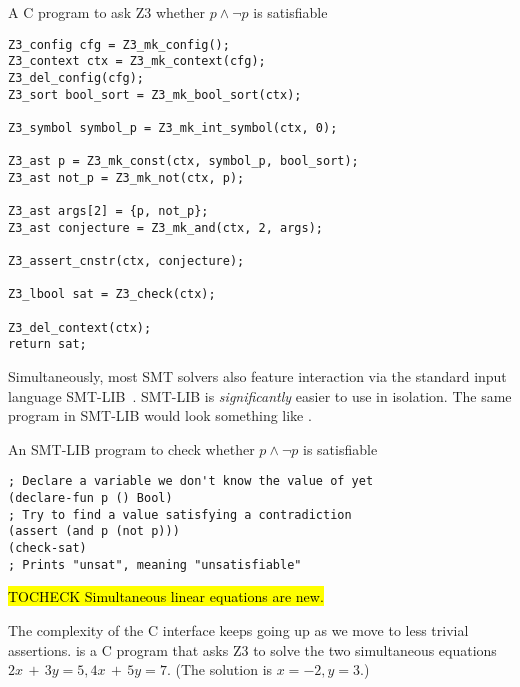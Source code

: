 \begin{program}
\caption{A C program to ask Z3 whether $p \wedge \neg p$ is satisfiable}
\label{fig:c-prop}
\begin{verbatim}
Z3_config cfg = Z3_mk_config();
Z3_context ctx = Z3_mk_context(cfg);
Z3_del_config(cfg);
Z3_sort bool_sort = Z3_mk_bool_sort(ctx);

Z3_symbol symbol_p = Z3_mk_int_symbol(ctx, 0);

Z3_ast p = Z3_mk_const(ctx, symbol_p, bool_sort);
Z3_ast not_p = Z3_mk_not(ctx, p);

Z3_ast args[2] = {p, not_p};
Z3_ast conjecture = Z3_mk_and(ctx, 2, args);

Z3_assert_cnstr(ctx, conjecture);

Z3_lbool sat = Z3_check(ctx);

Z3_del_context(ctx);
return sat;
\end{verbatim}
\end{program}

Simultaneously, most SMT solvers also feature interaction via the standard
input language SMT-LIB~\cite{smtlib2:10}. SMT-LIB is \textit{significantly}
easier to use in isolation. The same program in SMT-LIB would look something
like .

\begin{program}
\caption{An SMT-LIB program to check whether $p \wedge \neg p$ is satisfiable}
\label{fig:smtlib-prop}
\begin{verbatim}
; Declare a variable we don't know the value of yet
(declare-fun p () Bool)
; Try to find a value satisfying a contradiction
(assert (and p (not p)))
(check-sat)
; Prints "unsat", meaning "unsatisfiable"
\end{verbatim}
\end{program}

\hl{TOCHECK Simultaneous linear equations are new.}

The complexity of the C interface keeps going up as we move to less trivial
assertions.  is a C program that asks Z3 to solve the
two simultaneous equations $2x\,+\,3y = 5, 4x\,+\,5y = 7$. (The solution is $x =
-2, y = 3$.)


